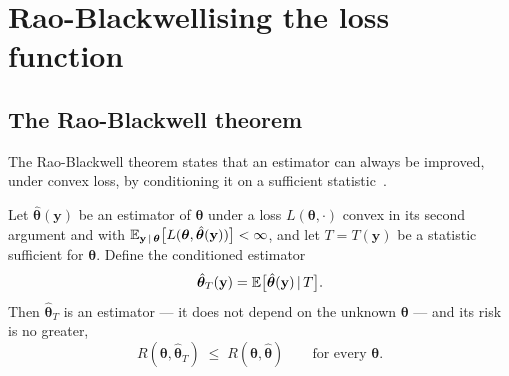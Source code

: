 \section{Rao-Blackwellising the loss function}
\label{sec:rb-loss}

\subsection{The Rao-Blackwell theorem}
\label{sec:rb-theorem}

The Rao-Blackwell theorem states that an estimator can always be
improved, under convex loss, by conditioning it on a sufficient
statistic~\citep{lehmann1998point}.

\begin{theorem}
\label{thm:rao-blackwell}
Let $\hat{\bm{\theta}}(\mathbf{y})$ be an estimator of $\bm{\theta}$
under a loss $L(\bm{\theta}, \cdot)$ convex in its second argument and
with $\mathbb{E}_{\mathbf{y} \,|\, \bm{\theta}}\big[L(\bm{\theta},
\hat{\bm{\theta}}(\mathbf{y}))\big] < \infty$, and let
$T = T(\mathbf{y})$ be a statistic sufficient for $\bm{\theta}$.
Define the conditioned estimator
%
\begin{equation}
  \hat{\bm{\theta}}_T(\mathbf{y})
  = \mathbb{E}\big[\hat{\bm{\theta}}(\mathbf{y}) \,|\, T\big].
  \label{eq:rb-conditioned}
\end{equation}
%
Then $\hat{\bm{\theta}}_T$ is an estimator --- it does not depend on
the unknown $\bm{\theta}$ --- and its risk is no greater,
%
\begin{equation}
  R(\bm{\theta}, \hat{\bm{\theta}}_T)
  \;\le\;
  R(\bm{\theta}, \hat{\bm{\theta}})
  \qquad \text{for every } \bm{\theta}.
  \label{eq:rb-risk-inequality}
\end{equation}
\end{theorem}

